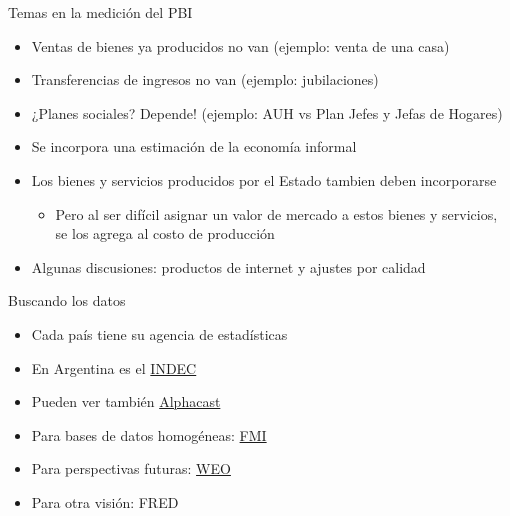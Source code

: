 \documentclass{beamer}
\begin{document}
\begin{frame}{Temas en la medición del PBI}
    \begin{itemize}
        \item Ventas de bienes ya producidos no van (ejemplo: venta de una casa)
        \item Transferencias de ingresos no van (ejemplo: jubilaciones) 
        \item ¿Planes sociales? Depende! (ejemplo: AUH vs Plan Jefes y Jefas de Hogares)
        \item Se incorpora una estimación de la economía informal
        \item Los bienes y servicios producidos por el Estado tambien deben incorporarse
        \begin{itemize}
            \item Pero al ser difícil asignar un valor de mercado a estos bienes y servicios, se los agrega al costo de producción
        \end{itemize}
        \item Algunas discusiones: productos de internet y ajustes por calidad
    \end{itemize}
\end{frame}

\begin{frame}{Buscando los datos}
    \begin{itemize}
        \item Cada país tiene su agencia de estadísticas \vspace{1mm}
        \item En Argentina es el \href{https://www.indec.gob.ar/}{INDEC} \vspace{1mm}
        \item Pueden ver también \href{https://www.alphacast.io/}{Alphacast} \vspace{1mm}
        \item Para bases de datos homogéneas:  \href{https://data.imf.org/?sk=4c514d48-b6ba-49ed-8ab9-52b0c1a0179b}{FMI}\vspace{1mm}
        \item Para perspectivas futuras: \href{https://www.imf.org/en/Publications/WEO}{WEO}\vspace{1mm} 
        \item Para otra visión: FRED     
    \end{itemize}
\end{frame}
\end{document}
